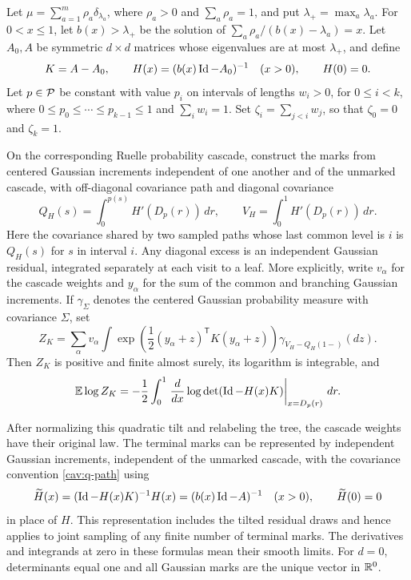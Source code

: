 \begin{lemma}\label{cav:quadratic}
Let $\mu=\sum_{a=1}^m\rho_a\delta_{\lambda_a}$, where
$\rho_a>0$ and $\sum_a\rho_a=1$, and put
$\lambda_+=\max_a\lambda_a$.  For $0<x\leq1$, let $b(x)>\lambda_+$
be the solution of $\sum_a\rho_a/(b(x)-\lambda_a)=x$.
Let $A_0,A$ be symmetric $d\times d$ matrices whose eigenvalues are at
most $\lambda_+$, and define
\begin{equation}\label{cav:q-def}
 K=A-A_0,\qquad H(x)=(b(x)\operatorname{Id}-A_0)^{-1}\quad(x>0),\qquad H(0)=0.
\end{equation}
Let $p\in\mathcal P$ be constant with value $p_i$ on intervals of lengths
$w_i>0$, for $0\leq i<k$, where
$0\leq p_0\leq\cdots\leq p_{k-1}\leq1$ and $\sum_iw_i=1$.
Set $\zeta_i=\sum_{j<i}w_j$, so that $\zeta_0=0$ and $\zeta_k=1$.

On the corresponding Ruelle probability cascade, construct the marks
from centered Gaussian increments independent of one another and of the
unmarked cascade, with off-diagonal covariance path and diagonal covariance
\begin{equation}\label{cav:q-path}
 Q_H(s)=\int_0^{p(s)}H'(D_p(r))\,dr,
 \qquad V_H=\int_0^1H'(D_p(r))\,dr.
\end{equation}
Here the covariance shared by two sampled paths whose last common level
is $i$ is $Q_H(s)$ for $s$ in interval $i$.  Any diagonal excess is an
independent Gaussian residual, integrated separately at each visit to a
leaf.  More explicitly, write $v_\alpha$ for the cascade weights and
$y_\alpha$ for the sum of the common and branching Gaussian increments.
If $\gamma_\Sigma$ denotes the centered Gaussian probability measure
with covariance $\Sigma$, set
\[
 Z_K=\sum_\alpha v_\alpha
       \int\exp\left(\frac12(y_\alpha+z)^{\mathsf T}
                              K(y_\alpha+z)\right)
              \gamma_{V_H-Q_H(1-)}(dz).
\]
Then $Z_K$ is positive and finite almost surely, its logarithm is
integrable, and
\begin{equation}\label{cav:q-log}
 \mathbb E\log Z_K
 =-\frac12\int_0^1
   \left.\frac{d}{dx}\log\det(\operatorname{Id}-H(x)K)\right|_{x=D_p(r)}\,dr.
\end{equation}

After normalizing this quadratic tilt and relabeling the tree, the
cascade weights have their original law.  The terminal marks can be
represented by independent Gaussian increments, independent of the
unmarked cascade, with the covariance convention \eqref{cav:q-path}
using
\begin{equation}\label{cav:q-transform}
 \widetilde H(x)=(\operatorname{Id}-H(x)K)^{-1}H(x)
               =(b(x)\operatorname{Id}-A)^{-1}\quad(x>0),
 \qquad \widetilde H(0)=0
\end{equation}
in place of $H$.  This representation includes the tilted residual
draws and hence applies to joint sampling of any finite number of
terminal marks.  The derivatives and integrands at zero in these
formulas mean their smooth limits.  For $d=0$, determinants equal one
and all Gaussian marks are the unique vector in $\mathbb R^0$.
\end{lemma}

